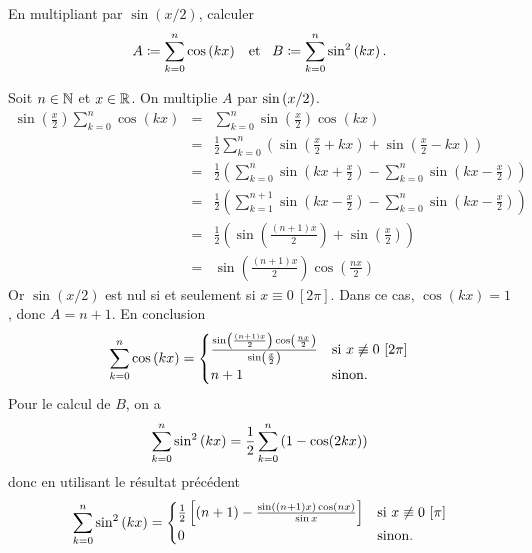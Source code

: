 \documentclass{magnolia}
\begin{document}

\begin{exoUnique}
\exo En multipliant par $\sin(x/2)$, calculer
  \[A\coloneqq\sum_{k=0}^n \cos\left(kx\right) \quad\!\text{et}\quad\! B\coloneqq\sum_{k=0}^n \sin^2\left(kx\right).\]
  \begin{sol}
  Soit $n\in\mathbb{N}$ et $x\in\mathbb{R}$. On multiplie $A$ par $\sin\left(x/2\right)$.
  \begin{eqnarray*}
  \sin\left( \frac{x}{2}\right)\sum_{k=0}^n \cos(kx)
  &=& \sum_{k=0}^n \sin\left( \frac{x}{2}\right)\cos (kx)\\
  &=& \frac{1}{2}\sum_{k=0}^n \left(\sin \left( \frac{x}{2}+kx\right) +\sin \left( \frac{x}{2}-kx\right) \right)\\
  &=& \frac{1}{2}\left( \sum_{k=0}^n \sin \left(kx+ \frac{x}{2}\right) -\sum_{k=0}^n \sin \left(kx- \frac{x}{2}\right)    \right)\\
  &=& \frac{1}{2}\left( \sum_{k=1}^{n+1} \sin \left(kx- \frac{x}{2}\right) -\sum_{k=0}^n \sin \left(kx- \frac{x}{2}\right)    \right)\\
  &=& \frac{1}{2}\left(\sin \left( \frac{(n+1)x}{2}\right) +\sin\left(  \frac{x}{2} \right) \right)\\
  &=& \sin \left(\frac{(n+1)x}{2}\right) \cos\left( \frac{nx}{2}\right)
  \end{eqnarray*}
  Or $\sin(x/2)$ est nul si et seulement si $x\equiv 0\ [2\pi]$. Dans ce cas, $\cos(kx)=1$, donc 
  $A=n+1$. En conclusion
  \[\sum_{k=0}^n \cos\left(kx\right)=
    \begin{cases}
    \frac{\sin\left(\frac{(n+1)x}{2}\right)\cos\left(\frac{nx}{2}\right)}{\sin\left(\frac{x}{2}\right)}
    & \text{si $x\not\equiv 0\ [2\pi]$}\\
    n+1 & \text{sinon.}
    \end{cases}\]
  Pour le calcul de $B$, on a
  \[\sum_{k=0}^n \sin^2\left(kx\right)=\frac{1}{2 } \sum_{k=0}^{n}\left( 1-\cos (2kx)\right)\]
  donc en utilisant le résultat précédent
  \[\sum_{k=0}^n \sin^2\left(kx\right)=
    \begin{cases}
    \frac{1}{2}\left[\left(n+1\right)-\frac{\sin((n+1)x)\cos(nx)}{\sin x}\right] &
      \text{si $x\not\equiv 0\ [\pi]$}\\
    0 & \text{sinon.}
    \end{cases}\]
  \end{sol}
\end{exoUnique}
\end{document}
